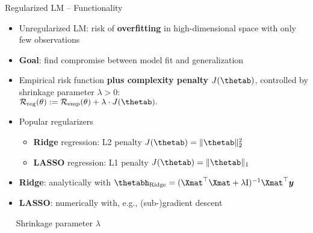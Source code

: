 \begin{frame}{Regularized LM -- Functionality}


\begin{itemize}
  \item Unregularized LM: risk of \textbf{overfitting} in high-dimensional 
  space with only few observations
  \item \textbf{Goal}: find compromise between model fit and generalization
\end{itemize}

\medskip




\medskip


\begin{itemize}
  \item Empirical risk function \textbf{plus complexity penalty} 
  $J(\thetab)$, controlled by shrinkage parameter $\lambda > 0$: \\
  $\riskrt := \risket + \lambda \cdot J(\thetab).$ 
  \item Popular regularizers
  \begin{itemize} 
    \item \textbf{Ridge} regression: L2 penalty $J(\thetab) = \|\thetab\|_2^2 $
    \item \textbf{LASSO} regression: L1 penalty $J(\thetab) = \|\thetab\|_1 $
  \end{itemize}
\end{itemize}

\medskip

\begin{itemize}
  \item \textbf{Ridge}: analytically with 
  $\thetabh_{\text{Ridge}} = (\Xmat^\top \Xmat  + \lambda \id)^{-1} \Xmat^\top 
  \yv$
  \item \textbf{LASSO}: numerically with, e.g., (sub-)gradient descent
\end{itemize}

\medskip

 ~~ Shrinkage parameter $\lambda$

\medskip


\end{frame}

